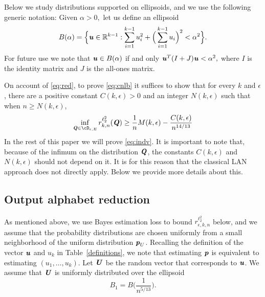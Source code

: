 \documentclass[11pt,onecolumn]{IEEEtran}
\def\mathbi#1{{\textbf{\textit #1}}}
\begin{document}
  Below we study distributions supported on ellipsoids, and we use the following generic notation: Given $\alpha>0,$ let us define an ellipsoid
  \begin{equation}\label{eq:ellipsoid}
B(\alpha)=\Big\{\mathbi{u}\in \mathbb{R}^{k-1}: 
 \sum_{i=1}^{k-1}  u_i^2 + \Big(\sum_{i=1}^{k-1}  u_i\Big)^2 < \alpha^2 \Big\}.
  \end{equation}
For future use we note that  $\mathbi{u}\in B(\alpha)$ if and only
$\mathbi{u}^T (I+J)\mathbi{u}<\alpha^2,$
where $I$ is the identity matrix and $J$ is the all-ones matrix.




\vspace*{.2in}
On account of \eqref{eq:red}, to prove \eqref{eq:cnlb} it suffices to show that for every $k$ and $\epsilon$, there are a positive constant $C(k,\epsilon)>0$ and an integer $N(k,\epsilon)$ such that when $n \ge N(k,\epsilon)$,
\begin{equation}\label{eq:indv}
\inf_{\mathbi{Q}\in \cD_{\epsilon,E}}r_{k,n}^{\ell_2^2}(\mathbi{Q}) \ge \frac 1n
M(k,\epsilon)
 - \frac{C(k,\epsilon)} {n^{14/13} }
\end{equation}
In the rest of this paper we will prove \eqref{eq:indv}. It is important to note that, because of the infimum on the distribution $\mathbi{Q}$, the constants
$C(k,\epsilon)$ and $N(k,\epsilon)$ should not depend on it. It is for this reason that the classical LAN approach does not directly apply. Below we provide more details about this.


\subsection{Output alphabet reduction}\label{Sect:OAR}
As mentioned above, we use Bayes estimation loss to bound $r_{\epsilon, k,n}^{\ell_2^2}$ below, and we assume that the probability distributions are chosen uniformly from a small neighborhood of the uniform distribution $\mathbi{p}_U$. Recalling the definition
of the vector $\mathbi{u}$ and $u_k$ in Table~\ref{definitions}, we note that estimating $\mathbi{p}$ is equivalent to estimating $(u_1,\dots,u_k).$
Let $\mathbi{U}$ be the random vector that corresponds to $\mathbi{u}$. We assume that $\mathbi{U}$ is uniformly distributed over the ellipsoid
   \begin{equation}\label{eq:B1}
B_1=B\Big(\frac{1}{n^{5/13}}\Big).
  \end{equation}
\end{document}
